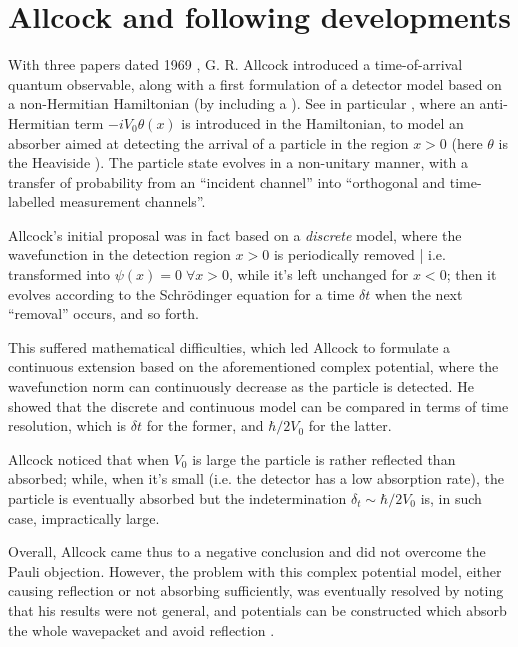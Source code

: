 \section{Allcock and following developments}\label{sec:allcock}

With three papers dated 1969 \parencite{Allcock-1, Allcock-2, Allcock-3}, G. R. Allcock
introduced a time-of-arrival quantum observable,
along with a first formulation of a detector model based on a non-Hermitian
Hamiltonian (by including a ).
See in particular \cite[\s II-IV]{Allcock-2}, where an anti-Hermitian term
$-iV_0\theta(x)$ is introduced in the Hamiltonian,
to model an absorber aimed at detecting
the arrival of a particle in the region $x>0$
(here $\theta$ is the Heaviside ).
The particle state evolves
in a non-unitary manner, with a transfer of probability
from an ``incident channel''
into ``orthogonal and time-labelled measurement channels''.

Allcock's initial proposal was in fact based on a \emph{discrete} model, where
the wavefunction in the detection region $x>0$
is periodically removed | i.e. transformed into $\psi(x) = 0 \; \forall x>0$,
while it's left unchanged for $x < 0$; then it evolves according to the Schr\"odinger equation
for a time $\delta t$ when the next ``removal'' occurs, and so forth.

This suffered mathematical difficulties, which led Allcock to formulate a continuous extension
based on the aforementioned complex potential,
where the wavefunction norm can continuously decrease as the particle is detected.
He showed that the discrete and continuous model
can be compared in terms of time resolution, which is $\delta t$ for the former,
and $\hbar/2V_0$ for the latter. 

Allcock noticed that when $V_0$ is large the particle is
rather reflected
than absorbed;
while, when it's small (i.e. the detector has a low absorption rate),
the particle is eventually absorbed but
the indetermination $\delta_t \sim \hbar/2V_0$
is, in such case, impractically large.

Overall, Allcock came thus to a negative conclusion and did not overcome the Pauli objection.
However, the problem with this complex potential model, either causing reflection
or not absorbing sufficiently, was eventually resolved
by noting that his results were not general, and
potentials can be constructed which absorb the whole wavepacket
and avoid reflection \parencite{Muga_TOAQM, Muga_CompositeAbsPot, ComplexAbsPot}.

